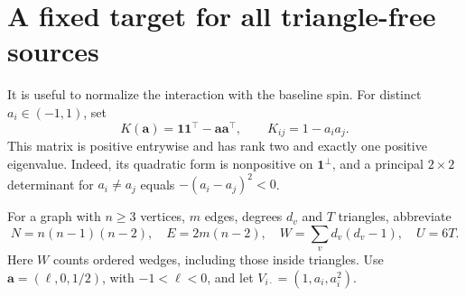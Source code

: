 \documentclass[11pt]{article}
\theoremstyle{remark}
\newcommand{\one}{\mathbf 1}
\begin{document}
\section{A fixed target for all triangle-free sources}
It is useful to normalize the interaction with the baseline spin.
For distinct $a_i\in(-1,1)$, set
\begin{equation}
 K(\mathbf a)=\one\one^\top-\mathbf a\mathbf a^\top,
 \qquad K_{ij}=1-a_i a_j.                              \label{eq:K}
\end{equation}
This matrix is positive entrywise and has rank two and exactly one
positive eigenvalue. Indeed, its quadratic form is nonpositive on
$\one^\perp$, and a principal $2\times2$ determinant for $a_i\ne a_j$
equals $-(a_i-a_j)^2<0$.

For a graph with $n\geq3$ vertices, $m$ edges, degrees $d_v$ and
$T$ triangles, abbreviate
\begin{equation}
 N=n(n-1)(n-2),\quad E=2m(n-2),\quad
 W=\sum_v d_v(d_v-1),\quad U=6T.                      \label{eq:counts}
\end{equation}
Here $W$ counts ordered wedges, including those inside triangles.
Use $\mathbf a=(\ell,0,1/2)$, with $-1<\ell<0$, and let
$V_{i\cdot}=(1,a_i,a_i^2)$.
\end{document}
